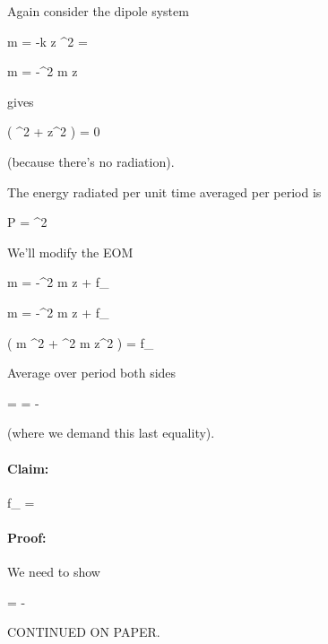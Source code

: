 Again consider the dipole system

m  = -k z
\omega^2 = 

m  = -\omega^2 m z

gives

\ddt{}\left(  \zdot^2 +  z^2 \right) = 0 

(because there's no radiation).

The energy radiated per unit time averaged per period is

P =  ^2

We'll modify the EOM

m  = -\omega^2 m z + f_{}

m   = -\omega^2 m z  + f_{} 

\ddt{} 
\left( m ^2 + \omega^2 m z^2 \right) 
= 
f_{}  \equiv {}

Average over period both sides

 = 
=
-  

(where we demand this last equality).

\paragraph{Claim:} 

f_{} =  

\paragraph{Proof:} 

We need to show 

= -  


CONTINUED ON PAPER.

\EndArticle
